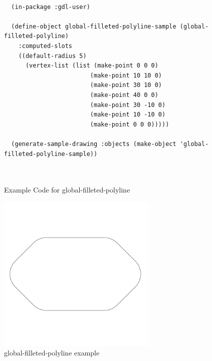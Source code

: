 \documentclass [11pt]{book}
\begin{document}
\begin{itemize}
\begin{figure}
\begin{lrbox}{\boxedverb}
\begin{minipage}{\linewidth}
{\begin{verbatim}

  (in-package :gdl-user)

  (define-object global-filleted-polyline-sample (global-filleted-polyline)
    :computed-slots
    ((default-radius 5)
      (vertex-list (list (make-point 0 0 0)
                        (make-point 10 10 0)
                        (make-point 30 10 0)
                        (make-point 40 0 0)
                        (make-point 30 -10 0)
                        (make-point 10 -10 0)
                        (make-point 0 0 0)))))

  (generate-sample-drawing :objects (make-object 'global-filleted-polyline-sample))

  
\end{verbatim}}
\end{minipage}
\end{lrbox}
\fbox{\usebox{\boxedverb}}

\caption{Example Code for global-filleted-polyline}

\label{fig:example-code-global-filleted-polyline}

\end{figure}

\begin{figure}
\begin{center}
\includegraphics[width=3in,height=3in]{../images/example-global-filleted-polyline.pdf}
\end{center}

\caption{global-filleted-polyline example}

\label{fig:global-filleted-polyline}

\end{figure}







\end{itemize}
\end{document}
